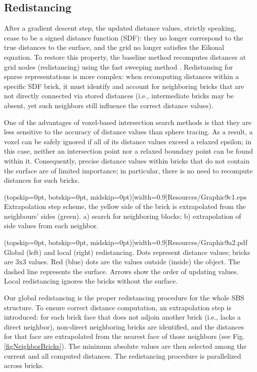 \documentclass{ieeeaccess}
\begin{document}
\subsection{Redistancing}

After a gradient descent step, the updated distance values, strictly speaking, cease to be a signed distance function (SDF): they no longer correspond to the true distances to the surface, and the grid no longer satisfies the Eikonal equation. To restore this property, the baseline method recomputes distances at grid nodes (redistancing) using the fast sweeping method \cite{RedistFSM}. Redistansing for sparse representations is more complex: when recomputing distances within a specific SDF brick, it must identify and account for neighboring bricks that are not directly connected via stored distances (i.e., intermediate bricks may be absent, yet such neighbors still influence the correct distance values).

One of the advantages of voxel-based intersection search methods is that they are less sensitive to the accuracy of distance values than sphere tracing. As a result, a voxel can be safely ignored if all of its distance values exceed a relaxed epsilon; in this case, neither an intersection point nor a relaxed boundary point can be found within it. Consequently, precise distance values within bricks that do not contain the surface are of limited importance; in particular, there is no need to recompute distances for such bricks.

\Figure[t](topskip=0pt, botskip=0pt, midskip=0pt)[width=0.9\linewidth]{Resources/Graphic9c1.eps} {
    Extrapolation step scheme, the yellow side of the brick is extrapolated from the neighbours' sides (green). a) search for neighboring blocks; b) extrapolation of side values from each neighbor.  
    \label{figNeighborBricks}
}

\Figure[h](topskip=0pt, botskip=0pt, midskip=0pt)[width=0.9\linewidth]{Resources/Graphic9a2.pdf} {
    Global (left) and local (right) redistancing. Dots represent distance values; bricks are 3x3 values. Red (blue) dots are the values outside (inside) the object. The dashed line represents the surface. Arrows show the order of updating values. Local redistancing ignores the bricks without the surface. \label{figRedistTypes}
}

Our global redistancing is the proper redistancing procedure for the whole SBS structure. To ensure correct distance computation, an extrapolation step is introduced: for each brick face that does not adjoin another brick (i.e., lacks a direct neighbor), non-direct neighboring bricks are identified, and the distances for that face are extrapolated from the nearest face of those neighbors (see Fig. \ref{figNeighborBricks}). The minimum absolute values are then selected among the current and all computed distances. The redistancing procedure is parallelized across bricks.
\end{document}
